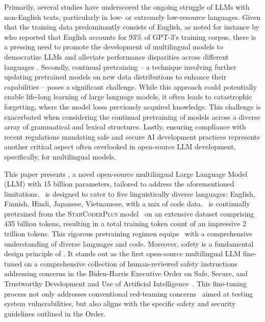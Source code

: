 Primarily, several studies \citep{bang2023multitask, jiao2023chatgpt, hendy2023good, huang2023languages} have underscored the ongoing struggle of LLMs with non-English texts, particularly in low- or extremely low-resource languages.  Given that the training data predominantly consists of English, as noted for instance by \citet{brown2020language} who reported that English accounts for 93\% of GPT-3's training corpus, there is a pressing need to promote the development of multilingual models to democratize LLMs and alleviate performance disparities across different languages \citep{chai2023ernie}. Secondly, continual pretraining -- a technique involving further updating pretrained models on new data distributions to enhance their capabilities \citep{gupta2023continual, fujii2024continual} -- poses a significant challenge. While this approach could potentially enable life-long learning of large language models, it often leads to catastrophic forgetting, where the model loses previously acquired knowledge. This challenge is exacerbated when considering the continual pretraining of models across a diverse array of grammatical and lexical structures. Lastly, ensuring compliance with recent regulations mandating safe and secure AI development practices represents another critical aspect often overlooked in open-source LLM development, specifically, for multilingual models.


This paper presents \textcolor{violet}{\system}, a novel open-source multilingual Large Language Model (LLM) with 15 billion parameters, tailored to address the aforementioned limitations. \system\ is designed to cater to five linguistically diverse languages: English, Finnish, Hindi, Japanese, Vietnamese, with a mix of code data. \system\ is continually pretrained from the \textsc{StarCoderPlus} model~\citep{li2023starcoder} on an extensive dataset comprising 435 billion tokens, resulting in a total training token count of an impressive 2 trillion tokens. This rigorous pretraining regimen equips \system\ with a comprehensive understanding of diverse languages and code. Moreover, safety is a fundamental design principle of \system. It stands out as the first open-source multilingual LLM fine-tuned on a comprehensive collection of human-reviewed safety instructions addressing concerns in the Biden-Harris Executive
Order on Safe, Secure, and Trustworthy Development and Use of Artificial Intelligence~\citep{whitehouse2023fact}. This fine-tuning process not only addresses conventional red-teaming concerns~\citep{ganguli2022red,perez2022red} aimed at testing system vulnerabilities, but also aligns with the specific safety and security guidelines outlined in the Order.


